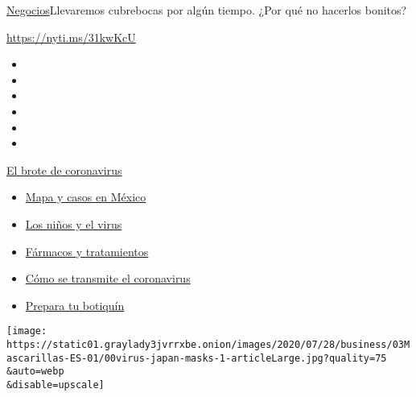 \href{/es/section/negocios}{Negocios}\textbar{}Llevaremos cubrebocas por
algún tiempo. ¿Por qué no hacerlos bonitos?

\url{https://nyti.ms/31kwKcU}

\begin{itemize}
\item
\item
\item
\item
\item
\item
\end{itemize}

\href{https://www.nytimes3xbfgragh.onion/es/spotlight/coronavirus?action=click\&pgtype=Article\&state=default\&region=TOP_BANNER\&context=storylines_menu}{El
brote de coronavirus}

\begin{itemize}
\tightlist
\item
  \href{https://www.nytimes3xbfgragh.onion/es/interactive/2020/espanol/america-latina/coronavirus-en-mexico.html?action=click\&pgtype=Article\&state=default\&region=TOP_BANNER\&context=storylines_menu}{Mapa
  y casos en México}
\item
  \href{https://www.nytimes3xbfgragh.onion/es/2020/07/31/espanol/ciencia-y-tecnologia/ninos-contagio-coronavirus.html?action=click\&pgtype=Article\&state=default\&region=TOP_BANNER\&context=storylines_menu}{Los
  niños y el virus}
\item
  \href{https://www.nytimes3xbfgragh.onion/es/interactive/2020/science/coronavirus-tratamientos-curas.html?action=click\&pgtype=Article\&state=default\&region=TOP_BANNER\&context=storylines_menu}{Fármacos
  y tratamientos}
\item
  \href{https://www.nytimes3xbfgragh.onion/es/2020/07/06/espanol/ciencia-y-tecnologia/coronavirus-transmision-aire.html?action=click\&pgtype=Article\&state=default\&region=TOP_BANNER\&context=storylines_menu}{Cómo
  se transmite el coronavirus}
\item
  \href{https://www.nytimes3xbfgragh.onion/es/2020/07/14/espanol/estilos-de-vida/botiquin-medicina-coronavirus.html?action=click\&pgtype=Article\&state=default\&region=TOP_BANNER\&context=storylines_menu}{Prepara
  tu botiquín}
\end{itemize}

\texttt{[image: https://static01.graylady3jvrrxbe.onion/images/2020/07/28/business/03Mascarillas-ES-01/00virus-japan-masks-1-articleLarge.jpg?quality=75\\\&auto=webp\\\&disable=upscale]}

